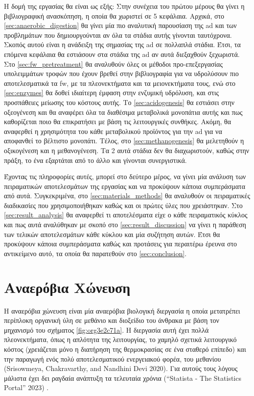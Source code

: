 \documentclass[11pt]{report}
\makeatletter
\newcommand{\citeprocitem}[2]{\hyper@linkstart{cite}{citeproc_bib_item_#1}#2\hyper@linkend}
\makeatother
\begin{document}
Η δομή της εργασίας θα είναι ως εξής: Στην συνέχεια του πρώτου μέρους θα γίνει η βιβλιογραφική ανασκόπηση, η οποία θα χωριστεί σε 5 κεφάλαια. Αρχικά, στο \autoref{sec:anaerobic_digestion} θα γίνει μία πιο αναλυτική παρουσίαση της \acrshort{ad} και των προβλημάτων που δημιουργούνται αν όλα τα στάδια αυτής γίνονται ταυτόχρονα. Σκοπός αυτού είναι η ανάδειξη της σημασίας της \acrshort{ad} σε πολλαπλά στάδια. Έτσι, τα επόμενα κεφάλαια θα εστιάσουν στα στάδια της \acrshort{ad} αν αυτά διεξαχθούν ξεχωριστά. Στο \autoref{sec:fw_pretreatment} θα αναλυθούν όλες οι μέθοδοι προ-επεξεργασίας υπολειμμάτων τροφών που έχουν βρεθεί στην βιβλιογραφία για να υδρολύσουν πιο αποτελεσματικά τα \acrshort{fw}, με τα πλεονεκτήματα και τα μειονεκτήματα τους, ενώ στο \autoref{sec:enzymes} θα δοθεί ιδιαίτερη έμφαση στην ενζυμική υδρόλυση, και στις προσπάθειες μείωσης του κόστους αυτής. Το \autoref{sec:acidogenesis} θα εστιάσει στην οξεογένεση και θα αναφέρει όλα τα διαθέσιμα μεταβολικά μονοπάτια αυτής και πως καθορίζεται ποιο θα επικρατήσει με βάση τις λειτουργικές συνθήκες. Ακόμη, θα αναφερθεί η χρησιμότητα του κάθε μεταβολικού προϊόντος για την \acrshort{ad} για να αποφανθεί το βέλτιστο μονοπάτι. Τέλος, στο \autoref{sec:methanogenesis} θα μελετηθούν η οξικογένεση και η μεθανογένεση. Τα 2 αυτά στάδια δεν θα διαχωριστούν, καθώς στην πράξη, το ένα εξαρτάται από το άλλο και γίνονται συνεργιστικά.

Έχοντας τις πληροφορίες αυτές, μπορεί στο δεύτερο μέρος, να γίνει μία ανάλυση των πειραματικών αποτελεσμάτων της εργασίας και να προκύψουν κάποια συμπεράσματα από αυτά. Συγκεκριμένα, στο \autoref{sec:materials_methods} θα αναλυθούν οι πειραματικές διαδικασίες που χρησιμοποιήθηκαν καθώς και οι πρώτες ύλες που χρειάστηκαν. Στο \autoref{sec:result_analysis} θα αναφερθεί τι αποτελέσματα είχε ο κάθε πειραματικός κύκλος και πως αυτά αναλύθηκαν με σκοπό στο \autoref{sec:result_discussion} να γίνει η παράθεση των τελικών αποτελεσμάτων κάθε κύκλου και μία συζήτηση αυτών. Έτσι θα προκύψουν κάποια συμπεράσματα καθώς και προτάσεις για περαιτέρω έρευνα στο αντικείμενο αυτό, τα οποία θα παρατεθούν στο \autoref{sec:conclusion}.

\chapter{Αναερόβια Χώνευση}
\label{sec:org20a9b3f}
\label{sec:anaerobic_digestion}

Η αναερόβια χώνευση είναι μία αναερόβια βιολογική διεργασία η οποία μετατρέπει περίπλοκη οργανική ύλη σε μεθάνιο και διοξείδιο του άνθρακα με βάση τον μηχανισμό του σχήματος \ref{fig:org3e2c71a}. Η διεργασία αυτή έχει πολλά πλεονεκτήματα, όπως η απλότητα της λειτουργίας, το χαμηλό σχετικά λειτουργικό κόστος (χρειάζεται μόνο η διατήρηση της θερμοκρασίας σε ένα σταθερό επίπεδο) και την παραγωγή ενός πολύ αποτελεσματικού ενεργειακού φορέα, του μεθανίου (\citeprocitem{67}{Srisowmeya, Chakravarthy, and Nandhini Devi 2020}). Για αυτούς τους λόγους μάλιστα έχει δει ραγδαία ανάπτυξη τα τελευταία χρόνια (\citeprocitem{68}{“Statista - The Statistics Portal” 2023}) .
\end{document}
